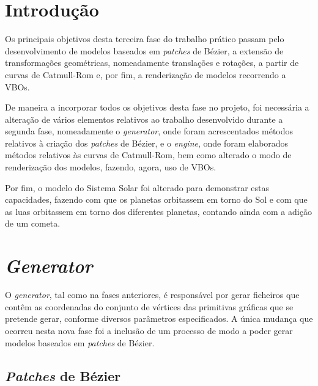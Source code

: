 \documentclass[a4paper, 11pt]{article}
\begin{document}
\pagebreak

\tableofcontents
\listoffigures

\pagebreak


\pagestyle{fancy}
\fancyhf{}


\renewcommand{\headrulewidth}{0pt}

\section{Introdução}

Os principais objetivos desta terceira fase do trabalho prático passam pelo desenvolvimento de 
modelos baseados em \textit{patches} de Bézier, a extensão de transformações geométricas, 
nomeadamente translações e rotações, a partir de curvas de Catmull-Rom e, por fim, a 
renderização de modelos recorrendo a VBOs.

De maneira a incorporar todos os objetivos desta fase no projeto, foi necessária a alteração de 
vários elementos relativos ao trabalho desenvolvido durante a segunda fase, nomeadamente o 
\textit{generator}, onde foram acrescentados métodos relativos à criação dos \textit{patches} 
de Bézier, e o \textit{engine}, onde foram elaborados métodos relativos às curvas de 
Catmull-Rom, bem como alterado o modo de renderização dos modelos, fazendo, agora, uso de VBOs.

Por fim, o modelo do Sistema Solar foi alterado para demonstrar estas capacidades, fazendo com que 
os planetas orbitassem em torno do Sol e com que as luas orbitassem em torno dos diferentes 
planetas, contando ainda com a adição de um cometa.

\pagebreak

\section{\textit{Generator}}

O \textit{generator}, tal como na fases anteriores, é responsável por gerar ficheiros que contêm 
as coordenadas do conjunto de vértices das primitivas gráficas que se pretende gerar, conforme 
diversos parâmetros especificados. A única mudança que ocorreu nesta nova fase foi a inclusão 
de um processo de modo a poder gerar modelos baseados em \textit{patches} de Bézier.

\subsection{\textit{Patches} de Bézier}
\end{document}
